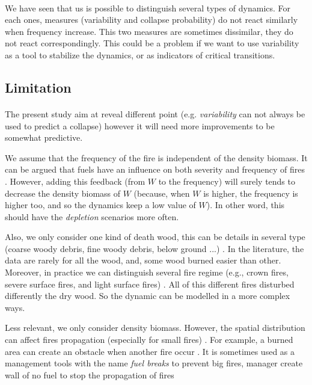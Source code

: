 \documentclass{article}
\begin{document}
\paragraph{} %
We have seen that us is possible to distinguish several types of dynamics. For each ones, measures (variability and collapse probability) do not react similarly when frequency increase. This two measures are sometimes dissimilar, they do not react correspondingly. This could be a problem if we want to use variability as a tool to stabilize the dynamics, or as indicators of critical transitions.



\subsection{Limitation}

\paragraph{}
The present study aim at reveal different point (e.g. \textit{variability} can not always be used to predict a collapse) however it will need  more improvements to be somewhat predictive.

\label{discussion_frequency_ass}
We assume that the frequency of the fire is independent of the density biomass. It can be argued that fuels have an influence on both severity and frequency  of fires \citep{schoennagel_interaction_2004}. However, adding this feedback (from $W$ to the frequency) will surely tends to decrease the density biomass of $W$ (because, when $W$ is higher, the frequency is higher too, and so the dynamics keep a low value of $W$). In other word, this should have the \textit{depletion} scenarios more often.

Also, we only consider one kind of death wood, this can be details in several type (coarse woody debris, fine woody debris, below ground ...) \citep{russell_quantifying_2015}. In the literature, the data are rarely for all the wood, and, some wood burned easier than other. Moreover, in practice we can distinguish several fire regime (e.g., crown fires, severe surface fires, and light surface fires) \citep{reichle_fire_1981}. All of this different fires disturbed differently the dry wood. So the dynamic can be modelled in a more complex ways.

Less relevant, we only consider density biomass. However, the spatial distribution can affect fires propagation (especially for small fires) \citep{beaty_spatial_2002}. For example, a burned area can create an obstacle when another fire occur \citep{bergeron_natural_2002, ager_modeling_2007}. It is sometimes used as a management tools with the name \textit{fuel breaks} to prevent big fires, manager create wall of no fuel to stop the propagation of fires \citep{syphard_comparing_2011, agee_use_2000}
\end{document}
